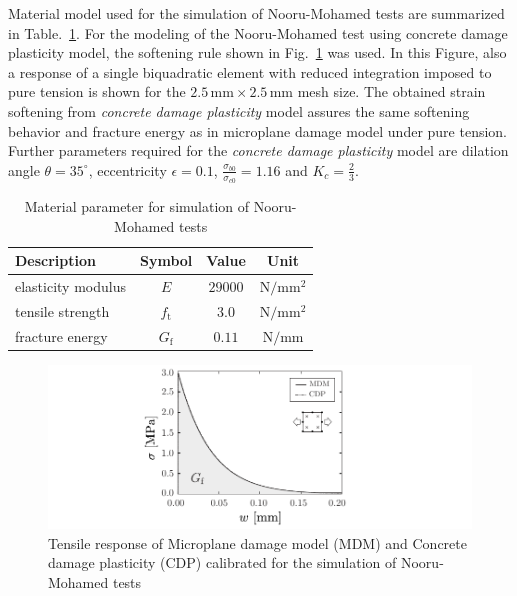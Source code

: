 \documentclass[main.tex]{subfiles}
\begin{document}
Material model used for the simulation of Nooru-Mohamed tests are summarized in Table.~\ref{TABnoorumat}. For the modeling of the Nooru-Mohamed test using concrete damage plasticity model, the softening rule shown in Fig.~\ref{FIGnoorumohamedmdmcdpcal} was used. In this Figure, also a response of a single biquadratic element with reduced integration imposed to pure tension is shown for the $2.5\,\mathrm{mm} \times 2.5\,\mathrm{mm}$ mesh size. The obtained strain softening from \textit{concrete damage plasticity} model assures the same softening behavior and fracture energy as in microplane damage model under pure tension. Further parameters required for the \textit{concrete damage plasticity} model are dilation angle $\theta = 35^\circ$, eccentricity $\epsilon = 0.1$, $\frac{\sigma_{b0}}{\sigma_{c0}}=1.16$ and $K_c=\frac{2}{3}$.
%
\begin{table}\centering
\caption{Material parameter for simulation of Nooru-Mohamed tests}
\begin{tabular}{l ccc}
        \textbf{Description} & \textbf{Symbol} & \textbf{Value} & \textbf{Unit}\\
  \hline
	elasticity modulus & $E$ & $29000$ & $\mathrm{N/mm^2}$ \\
  tensile strength & $f_\mathrm{t}$ & $3.0$ & $\mathrm{N/mm^2}$ \\
  fracture energy & $G_\mathrm{f}$ & $0.11$ & $\mathrm{N/mm}$ \\
\end{tabular}
\label{TABnoorumat}
\end{table}
%
\begin{figure}
\centering
\includegraphics[scale=1]{fig/nooru-mohamed-mdm-cdp-cal.pdf}
\caption{Tensile response of Microplane damage model (MDM) and Concrete damage plasticity (CDP) calibrated for the simulation of Nooru-Mohamed tests}
\label{FIGnoorumohamedmdmcdpcal}
\end{figure}
\end{document}
